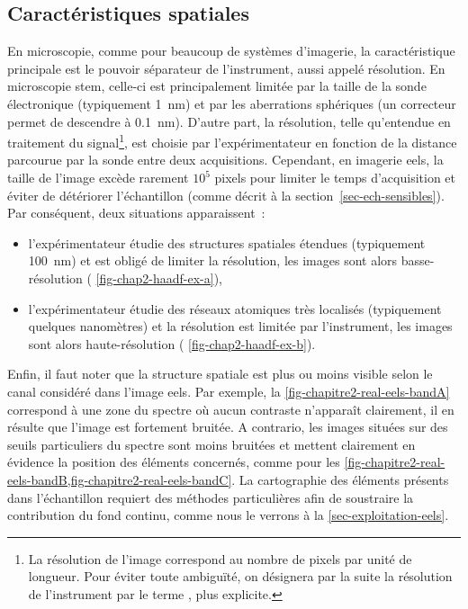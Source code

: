     \subsection{Caractéristiques spatiales} En microscopie, comme pour beaucoup de systèmes d'imagerie, la caractéristique principale est le pouvoir séparateur de l'instrument, aussi appelé résolution. En microscopie \gls{stem}, celle-ci est principalement limitée par la taille de la sonde électronique (typiquement 1~nm) et par les aberrations sphériques (un correcteur permet de descendre à 0.1~nm). D'autre part, la résolution, telle qu'entendue en traitement du signal\footnote{La résolution de l'image correspond au nombre de pixels par unité de longueur. Pour éviter toute ambiguïté, on désignera par la suite la résolution de l'instrument par le terme , plus explicite.}, est choisie par l'expérimentateur en fonction de la distance parcourue par la sonde entre deux acquisitions. Cependant, en imagerie \gls{eels}, la taille de l'image excède rarement $10^5$ pixels pour limiter le temps d'acquisition et éviter de détériorer l'échantillon (comme décrit à la section~\ref{sec-ech-sensibles}). Par conséquent, deux situations apparaissent~:
    \begin{itemize}
        \item l'expérimentateur étudie des structures spatiales étendues (typiquement 100~nm) et est obligé de limiter la résolution, les images sont alors basse-résolution (\cf{} \cref{fig-chap2-haadf-ex-a}),
        \item l'expérimentateur étudie des réseaux atomiques très localisés (typiquement quelques nanomètres) et la résolution est limitée par l'instrument, les images sont alors haute-résolution (\cf{} \cref{fig-chap2-haadf-ex-b}).
    \end{itemize}
    Enfin, il faut noter que la structure spatiale est plus ou moins visible selon le canal considéré dans l'image \gls{eels}. Par exemple, la \cref{fig-chapitre2-real-eels-bandA} correspond à une zone du spectre où aucun contraste n'apparaît clairement, il en résulte que l'image est fortement bruitée. A contrario, les images situées sur des seuils particuliers du spectre sont moins bruitées et mettent clairement en évidence la position des éléments concernés, comme pour les \cref{fig-chapitre2-real-eels-bandB,fig-chapitre2-real-eels-bandC}.  La cartographie des éléments présents dans l'échantillon requiert des méthodes particulières afin de soustraire la contribution du fond continu, comme nous le verrons à la \cref{sec-exploitation-eels}.

